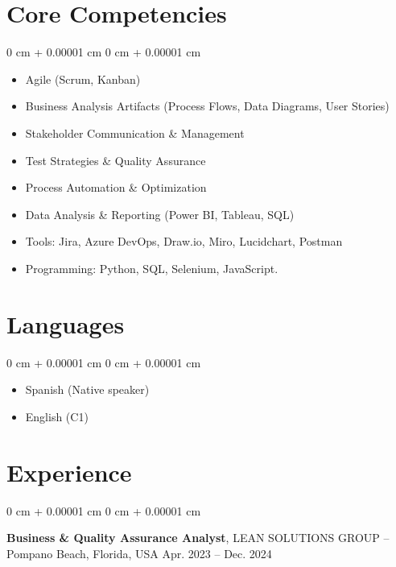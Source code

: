 \documentclass[10pt, letterpaper]{article}
\newenvironment{highlightsforbulletentries}{
    \begin{itemize}[
        topsep=0.10 cm,
        parsep=0.10 cm,
        partopsep=0pt,
        itemsep=0pt,
        leftmargin=10pt
    ]
}{
    \end{itemize}
} %
\newenvironment{onecolentry}{
    \begin{adjustwidth}{
        0 cm + 0.00001 cm
    }{
        0 cm + 0.00001 cm
    }
}{
    \end{adjustwidth}
} %
\newenvironment{twocolentry}[2][]{
    \onecolentry
    \def\secondColumn{#2}
    \setcolumnwidth{\fill, 4.5 cm}
    \begin{paracol}{2}
}{
    \switchcolumn \raggedleft \secondColumn
    \end{paracol}
    \endonecolentry
} %
\begin{document}
    \section{Core Competencies}
    \begin{onecolentry}
        \begin{multicols}{2}
        \begin{highlightsforbulletentries}
            \item Agile (Scrum, Kanban)
            \item Business Analysis Artifacts (Process Flows, Data Diagrams, User Stories)
            \item Stakeholder Communication \& Management
            \item Test Strategies \& Quality Assurance
            \item Process Automation \& Optimization
            \item Data Analysis \& Reporting (Power BI, Tableau, SQL)
            \item Tools: Jira, Azure DevOps, Draw.io, Miro, Lucidchart, Postman
            \item Programming: Python, SQL, Selenium, JavaScript.
        \end{highlightsforbulletentries}
        \end{multicols}
    \end{onecolentry}

    \section{Languages}
        
      \begin{onecolentry}
        \begin{multicols}{2}
        \begin{highlightsforbulletentries}
            \item Spanish (Native speaker)
            \item English (C1)
        \end{highlightsforbulletentries}
        \end{multicols}
    \end{onecolentry}

    
    \section{Experience}
        
        \begin{twocolentry}{
            Apr. 2023 – Dec. 2024
        }
            \textbf{Business \& Quality Assurance Analyst}, LEAN SOLUTIONS GROUP -- Pompano Beach, Florida, USA\end{twocolentry}
\end{document}
